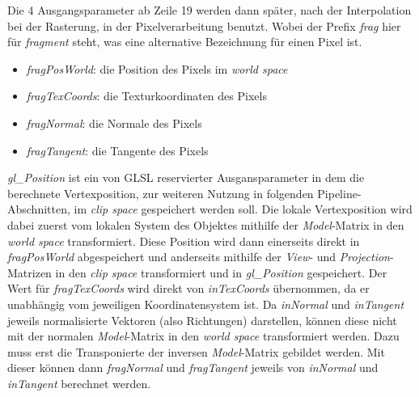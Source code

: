 \documentclass[oneside]{ausarbeitung}
\begin{document}
Die 4 Ausgangsparameter ab Zeile 19 werden dann später, nach der Interpolation bei der Rasterung, in der Pixelverarbeitung benutzt. Wobei der Prefix \textit{frag} hier für \textit{fragment} steht, was eine alternative Bezeichnung für einen Pixel ist.
\begin{itemize}
\item{\textit{fragPosWorld}: die Position des Pixels im \textit{world space}}
\item{\textit{fragTexCoords}: die Texturkoordinaten des Pixels}
\item{\textit{fragNormal}: die Normale des Pixels}
\item{\textit{fragTangent}: die Tangente des Pixels}
\end{itemize}

\textit{gl\_Position} ist ein von \ac{GLSL} reservierter Ausgansparameter in dem die berechnete Vertexposition, zur weiteren Nutzung in folgenden Pipeline-Abschnitten, im \textit{clip space} gespeichert werden soll. Die lokale Vertexposition wird dabei zuerst vom lokalen System des Objektes mithilfe der \textit{Model}-Matrix in den \textit{world space} transformiert.  Diese Position wird dann einerseits direkt in \textit{fragPosWorld} abgespeichert und anderseits mithilfe der \textit{View}- und \textit{Projection}-Matrizen in den \textit{clip space} transformiert und in \textit{gl\_Position} gespeichert. Der Wert für \textit{fragTexCoords} wird direkt von \textit{inTexCoords} übernommen, da er unabhängig vom jeweiligen Koordinatensystem ist. Da \textit{inNormal} und \textit{inTangent} jeweils normalisierte Vektoren (also Richtungen) darstellen, können diese nicht mit der normalen \textit{Model}-Matrix in den \textit{world space} transformiert werden. Dazu muss erst die Transponierte der inversen \textit{Model}-Matrix gebildet werden. Mit dieser können dann \textit{fragNormal} und \textit{fragTangent} jeweils von \textit{inNormal} und \textit{inTangent} berechnet werden.
\end{document}

